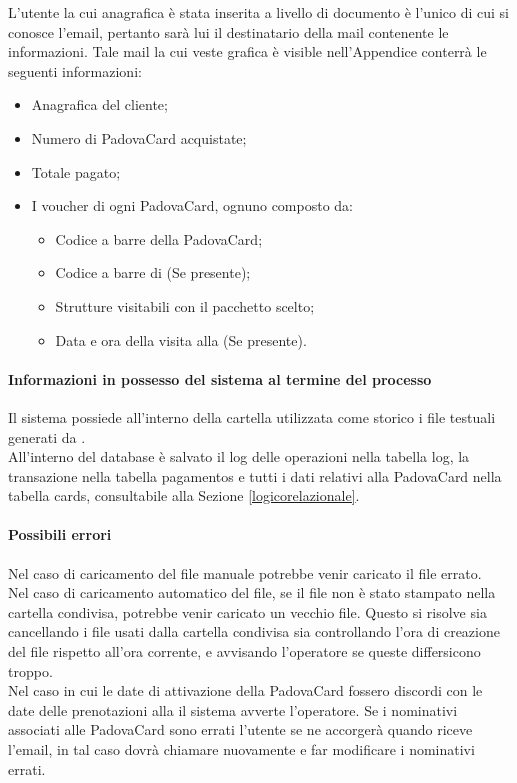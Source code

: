 L'utente la cui anagrafica è stata inserita a livello di documento è l'unico di cui si conosce l'email, pertanto sarà lui il destinatario della mail contenente le informazioni. Tale mail la cui veste grafica è visible nell'Appendice %
conterrà le seguenti informazioni:
\begin{itemize}
\item Anagrafica del cliente;
\item Numero di PadovaCard acquistate;
\item Totale pagato;
\item I voucher di ogni PadovaCard, ognuno composto da:
	\begin{itemize}
		\item Codice a barre della PadovaCard;
        \item Codice a barre di \tlite (Se presente);
        \item Strutture visitabili con il pacchetto scelto;
        \item Data e ora della visita alla \cappella (Se presente).
	\end{itemize}
\end{itemize}

\paragraph{Informazioni in possesso del sistema al termine del processo}

Il sistema possiede all'interno della cartella utilizzata come storico i file testuali generati da \tlite. \\

All'interno del database è salvato il log delle operazioni nella tabella log, la transazione nella tabella pagamentos e tutti i dati relativi alla PadovaCard nella tabella cards, consultabile alla Sezione \ref{logicorelazionale}.

\paragraph{Possibili errori} 

Nel caso di caricamento del file manuale potrebbe venir caricato il file errato. \\
Nel caso di caricamento automatico del file, se il file non è stato stampato nella cartella condivisa, potrebbe venir caricato un vecchio file. Questo si risolve sia cancellando i file usati dalla cartella condivisa sia controllando l'ora di creazione del file rispetto all'ora corrente, e avvisando l'operatore se queste differsicono troppo. \\
Nel caso in cui le date di attivazione della PadovaCard fossero discordi con le date delle prenotazioni alla \cappella il sistema avverte l'operatore.
Se i nominativi associati alle PadovaCard sono errati l'utente se ne accorgerà quando riceve l'email, in tal caso dovrà chiamare nuovamente e far modificare i nominativi errati.

